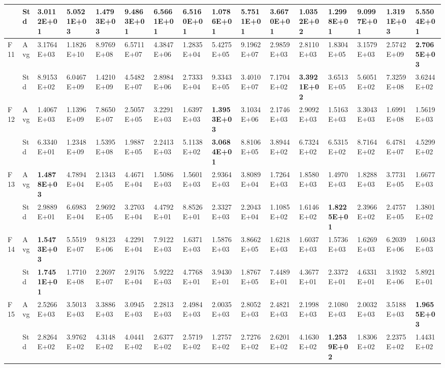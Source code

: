 \documentclass{article} %
\begin{document}
\begin{tabular}{|p{0.3in}|p{0.3in}|p{0.3in}|p{0.3in}|p{0.3in}|p{0.3in}|p{0.3in}|p{0.3in}|p{0.3in}|p{0.3in}|p{0.3in}|p{0.3in}|p{0.3in}|p{0.3in}|p{0.3in}|p{0.5in}|}
 & Std & 3.0112E+01 & 5.0521E+03 & 1.4793E+03 & 9.4863E+01 & 6.5661E+01 & 6.5160E+01 & \textbf{1.0786E+01} & 5.7511E+01 & 3.6670E+01 & 1.0352E+02 & 1.2998E+01 & 9.0997E+01 & 1.3191E+03 & 5.5504E+01 \\ \hline 
F11 & Avg & 3.1764E+03 & 1.1826E+10 & 8.9769E+08 & 6.5711E+07 & 4.3847E+06 & 1.2835E+04 & 5.4275E+05 & 9.1962E+07 & 2.9859E+03 & 2.8110E+03 & 1.8304E+05 & 3.1579E+03 & 2.5742E+09 & \textbf{2.7065E+03} \\ \hline 
 & Std & 8.9153E+02 & 6.0467E+09 & 1.4210E+09 & 4.5482E+07 & 2.8984E+06 & 2.7333E+04 & 9.3343E+05 & 3.4010E+07 & 7.1704E+02 & \textbf{3.3921E+02} & 3.6513E+05 & 5.6051E+02 & 7.3259E+08 & 3.6244E+02 \\ \hline 
F12 & Avg & 1.4067E+03 & 1.1396E+09 & 7.8650E+07 & 2.5057E+05 & 3.2291E+03 & 1.6397E+03 & \textbf{1.3953E+03} & 3.1034E+06 & 2.1746E+03 & 2.9092E+03 & 1.5163E+03 & 3.3043E+03 & 1.6991E+08 & 1.5619E+03 \\ \hline 
 & Std & 6.3340E+01 & 1.2348E+09 & 1.5395E+08 & 1.9887E+05 & 2.2413E+03 & 5.1138E+02 & \textbf{3.0684E+01} & 8.8106E+05 & 3.8944E+02 & 6.7324E+02 & 6.5315E+02 & 8.7164E+02 & 6.4781E+07 & 4.5299E+02 \\ \hline 
F13 & Avg & \textbf{1.4878E+03} & 4.7894E+04 & 2.1343E+05 & 4.4671E+04 & 1.5086E+03 & 1.5601E+03 & 2.9364E+03 & 3.8089E+04 & 1.7264E+03 & 1.8580E+03 & 1.4970E+03 & 1.8288E+03 & 3.7731E+05 & 1.6677E+03 \\ \hline 
 & Std & 2.9889E+01 & 6.6983E+04 & 2.9692E+05 & 3.2703E+04 & 4.4792E+01 & 8.8526E+01 & 2.3327E+03 & 2.2043E+04 & 1.1085E+02 & 1.6146E+02 & \textbf{1.8225E+01} & 2.3966E+02 & 2.4757E+05 & 1.3801E+02 \\ \hline 
F14 & Avg & \textbf{1.5473E+03} & 5.5519E+07 & 9.8123E+06 & 4.2291E+04 & 7.9122E+03 & 1.6371E+03 & 1.5876E+03 & 3.8662E+05 & 1.6218E+03 & 1.6037E+03 & 1.5736E+03 & 1.6269E+03 & 6.2039E+06 & 1.6043E+03 \\ \hline 
 & Std & \textbf{1.7451E+01} & 1.7710E+08 & 2.2697E+07 & 2.9176E+04 & 5.9222E+03 & 4.7768E+01 & 3.9430E+01 & 1.8767E+05 & 7.4489E+01 & 4.3677E+01 & 2.3372E+01 & 4.6331E+01 & 3.1932E+06 & 5.8921E+01 \\ \hline 
F15 & Avg & 2.5266E+03 & 3.5013E+03 & 3.3886E+03 & 3.0945E+03 & 2.2813E+03 & 2.4984E+03 & 2.0035E+03 & 2.8052E+03 & 2.4821E+03 & 2.1998E+03 & 2.1080E+03 & 2.0032E+03 & 3.5188E+03 & \textbf{1.9655E+03} \\ \hline 
 & Std & 2.8264E+02 & 3.9762E+02 & 4.3148E+02 & 4.0441E+02 & 2.6377E+02 & 2.5719E+02 & 1.2757E+02 & 2.7276E+02 & 2.6201E+02 & 4.1630E+02 & \textbf{1.2539E+02} & 1.8306E+02 & 2.2375E+02 & 1.4431E+02 \\ \hline 

\end{tabular}
\end{document}
